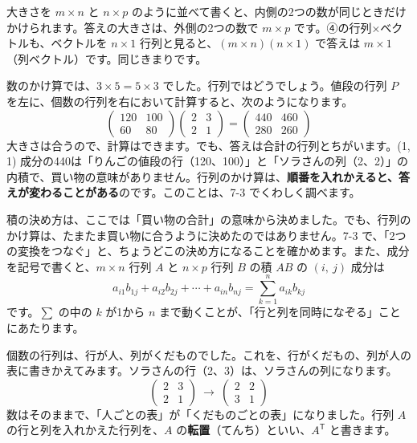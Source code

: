 大きさを $m\times n$ と $n\times p$ のように並べて書くと、内側の2つの数が同じときだけかけられます。答えの大きさは、外側の2つの数で $m\times p$ です。④の行列×ベクトルも、ベクトルを $n\times1$ 行列と見ると、$(m\times n)(n\times1)$ で答えは $m\times1$（列ベクトル）です。同じきまりです。

数のかけ算では、$3\times5=5\times3$ でした。行列ではどうでしょう。値段の行列 $P$ を左に、個数の行列を右において計算すると、次のようになります。
\[ \begin{pmatrix} 120 & 100\\ 60 & 80 \end{pmatrix}\begin{pmatrix} 2 & 3\\ 2 & 1 \end{pmatrix}=\begin{pmatrix} 440 & 460\\ 280 & 260 \end{pmatrix} \]
大きさは合うので、計算はできます。でも、答えは合計の行列とちがいます。(1, 1) 成分の440は「りんごの値段の行（120、100）」と「ソラさんの列（2、2）」の内積で、買い物の意味がありません。行列のかけ算は、\textbf{順番を入れかえると、答えが変わることがある}のです。このことは、7-3 でくわしく調べます。

\begin{seikaku}
積の決め方は、ここでは「買い物の合計」の意味から決めました。でも、行列のかけ算は、たまたま買い物に合うように決めたのではありません。7-3 で、「2つの変換をつなぐ」と、ちょうどこの決め方になることを確かめます。また、成分を記号で書くと、$m\times n$ 行列 $A$ と $n\times p$ 行列 $B$ の積 $AB$ の $(i,\ j)$ 成分は
\[ a_{i1}b_{1j}+a_{i2}b_{2j}+\cdots+a_{in}b_{nj}=\sum_{k=1}^{n}a_{ik}b_{kj} \]
です。$\sum$ の中の $k$ が1から $n$ まで動くことが、「行と列を同時になぞる」ことにあたります。
\end{seikaku}


\label{bk:7-1:tenchi}個数の行列は、行が人、列がくだものでした。これを、行がくだもの、列が人の表に書きかえてみます。ソラさんの行（2、3）は、ソラさんの列になります。
\[ \begin{pmatrix} 2 & 3\\ 2 & 1 \end{pmatrix}\ \longrightarrow\ \begin{pmatrix} 2 & 2\\ 3 & 1 \end{pmatrix} \]
数はそのままで、「人ごとの表」が「くだものごとの表」になりました。行列 $A$ の行と列を入れかえた行列を、$A$ の\textbf{転置}（てんち）といい、$A^{\mathsf T}$ と書きます。


